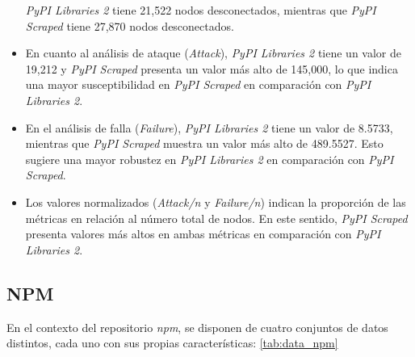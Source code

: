 \begin{itemize}
          \textit{PyPI Libraries 2} tiene 21,522 nodos desconectados, mientras que \textit{PyPI Scraped} tiene 27,870 nodos desconectados.
    \item En cuanto al análisis de ataque (\textit{Attack}), \textit{PyPI Libraries 2}
          tiene un valor de 19,212 y \textit{PyPI Scraped} presenta un valor más alto de
          145,000, lo que indica una mayor susceptibilidad en \textit{PyPI Scraped} en
          comparación con \textit{PyPI Libraries 2}.
    \item En el análisis de falla (\textit{Failure}), \textit{PyPI Libraries 2} tiene un
          valor de 8.5733, mientras que \textit{PyPI Scraped} muestra un valor más alto de 489.5527.
          Esto sugiere una mayor robustez en \textit{PyPI Libraries 2} en comparación con
          \textit{PyPI Scraped}.
    \item Los valores normalizados (\textit{Attack/n} y \textit{Failure/n}) indican la
          proporción de las métricas en relación al número total de nodos. En este sentido,
          \textit{PyPI Scraped} presenta valores más altos en ambas métricas en comparación con
          \textit{PyPI Libraries 2}.
\end{itemize}


\subsection{NPM}

En el contexto del repositorio \textit{npm}, se disponen de cuatro conjuntos de datos
distintos, cada uno con sus propias características: \ref{tab:data_npm}

